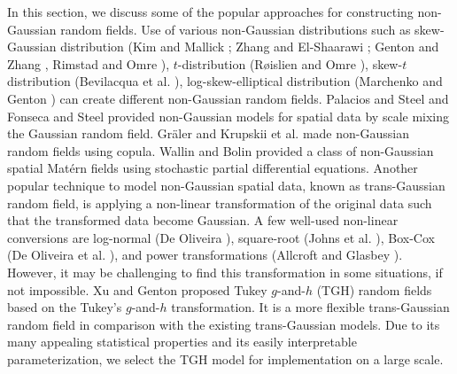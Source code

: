 \documentclass[conference]{IEEEtran}
\begin{document}
In this section, we discuss some of the popular 
approaches for constructing non-Gaussian random fields. Use of various non-Gaussian distributions such as skew-Gaussian distribution (Kim and Mallick \cite{2004.H.M.K.B.M.JournalofStatisticalPlanningandInference}; Zhang and El-Shaarawi \cite{2010.H.Z.A.E.Environmetrics}; Genton and Zhang \cite{2012.M.G.H.Z.ChileanJournalofStatistics}, Rimstad and Omre \cite{2014.K.R.H.O.SpatialStatistics}), $t$-distribution (Røislien and Omre \cite{2006.J.R.H.O.MathematicalGeology}), 
skew-$t$ distribution (Bevilacqua et al. \cite{2021.M.B.C.C.R.B.A.V.V.M.ScandinavianJournalofStatistics}), log-skew-elliptical distribution (Marchenko and Genton \cite{2010.Y.V.M.M.G.Environmetrics}) can create 
different non-Gaussian random fields. Palacios and Steel \cite{2006.M.B.P.M.F.J.S.JournaloftheAmericanStatisticalAssociation} and Fonseca and Steel \cite{2011.T.C.O.F.M.F.J.S.Biometrika} provided non-Gaussian models for spatial data by scale mixing the Gaussian 
random field. Gräler \cite{2014.B.G.SpatialStatistics} 
and Krupskii et al. \cite{2018.P.K.R.H.M.G.G.JournaloftheAmericanStatisticalAssociation} made non-Gaussian random fields using copula. Wallin and Bolin \cite{2015.J.W.D.B.ScandinavianJournalofStatistics} provided 
a class of non-Gaussian spatial Mat\'ern ﬁelds using stochastic partial differential equations. Another popular technique to model 
non-Gaussian spatial data, known as trans-Gaussian 
random field, is applying a non-linear transformation of 
the original data such that the transformed data become Gaussian. 
A few well-used non-linear conversions are log-normal (De Oliveira \cite{2006.V.D.O.ScandinavianJournalofStatistics}), 
square-root (Johns et al. \cite{2003.C.J.J.D.N.T.G.F.K.C.D.JournaloftheAmericanStatisticalAssociation}), Box-Cox (De Oliveira et al. \cite{1997.V.D.O.B.K.D.A.S.JournaloftheAmericanStatisticalAssociation}), and power transformations (Allcroft and Glasbey \cite{2003.D.J.A.C.A.G.JournaloftheRoyalStatisticalSociety}).
 However, it may be  challenging to find this transformation in some situations, if not impossible. Xu and Genton \cite{xu2017tukey} proposed Tukey $g$-and-$h$ (TGH) random fields based 
 on the Tukey's $g$-and-$h$ transformation. It is a more flexible trans-Gaussian random field in comparison with the existing 
 trans-Gaussian models. Due to its many appealing statistical properties and its easily interpretable parameterization, we select the 
 TGH model for implementation on a large scale.
\end{document}
